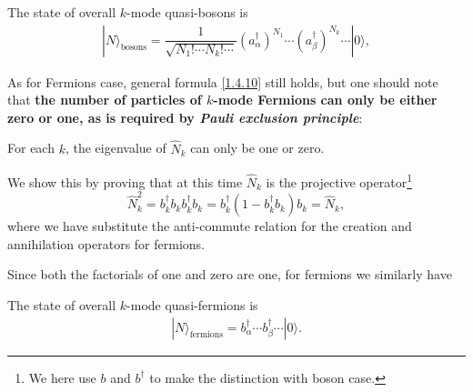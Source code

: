 \documentclass[b5paper,10pt,UTF8]{book}
\numberwithin{equation}{section}
\begin{document}
		\begin{Corollary}
			The state of overall $k$-mode quasi-bosons is
			\begin{align}
				|N\rangle_{\text{bosons}}=\dfrac{1}{\sqrt{N_1!\cdots N_k!\cdots}}(a^\dagger_\alpha)^{N_1}\cdots(a^\dagger_\beta)^{N_k}\cdots|0\rangle,\label{1.4.7}
			\end{align}
		\end{Corollary}
		As for Fermions case, general formula \eqref{1.4.10} still holds, but one should note that \textbf{the number of particles of $k$-mode Fermions can only be either zero or one, as is required by \emph{Pauli exclusion principle}}:
		\begin{Lemma}
			For each $k$, the eigenvalue of $\hat{N}_k$ can only be one or zero.
		\end{Lemma}
		\begin{Proof}
			We show this by proving that at this time $\hat{N}_k$ is the projective operator\footnote{We here use $b$ and $b^\dagger$ to make the distinction with boson case.}
			$$\hat{N}_k^2=b_k^\dagger b_k b_k^\dagger b_k=b_k^\dagger(1-b_k^\dagger b_k)b_k=\hat{N}_k,$$
			where we have substitute the anti-commute relation for the creation and annihilation operators for fermions.
		\end{Proof}
		Since both the factorials of one and zero are one, for fermions we similarly have
		\begin{Corollary}
			The state of overall $k$-mode quasi-fermions is
			\begin{align}
				|N\rangle_{\text{fermions}}=b^\dagger_\alpha\cdots b^\dagger_\beta\cdots|0\rangle.\label{1.4.8}
			\end{align}
		\end{Corollary}
	
\end{document}

